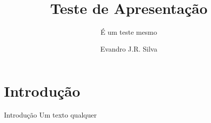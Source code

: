 \documentclass{beamer}
\title{Teste de Apresentação}
\subtitle{É um teste mesmo}
\author{Evandro J.R. Silva}
\institute{UFPI}
\date{}
\begin{document}
\begin{frame}
    \titlepage
\end{frame}

\begin{frame}
    \tableofcontents
\end{frame}

\section{Introdução}
\begin{frame}{Introdução}
    Um texto qualquer
\end{frame}
\end{document}
